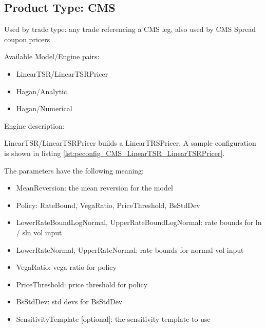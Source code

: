 \subsection{Product Type: CMS}

Used by trade type: any trade referencing a CMS leg, also used by CMS Spread coupon pricers

Available Model/Engine pairs:

\begin{itemize}
  \item LinearTSR/LinearTSRPricer
  \item Hagan/Analytic
  \item Hagan/Numerical
\end{itemize}

Engine description:

LinearTSR/LinearTSRPricer builds a LinearTRSPricer. A sample configuration is shown in listing
\ref{lst:peconfig_CMS_LinearTSR_LinearTSRPricer}.

The parameters have the following meaning:

\begin{itemize}
\item MeanReversion: the mean reversion for the model
\item Policy: RateBound, VegaRatio, PriceThreshold, BsStdDev
\item LowerRateBoundLogNormal, UpperRateBoundLogNormal: rate bounds for ln / sln vol input
\item LowerRateNormal, UpperRateNormal: rate bounds for normal vol input
\item VegaRatio: vega ratio for policy
\item PriceThreshold: price threshold for policy
\item BsStdDev: std devs for BsStdDev
\item SensitivityTemplate [optional]: the sensitivity template to use 
\end{itemize}

